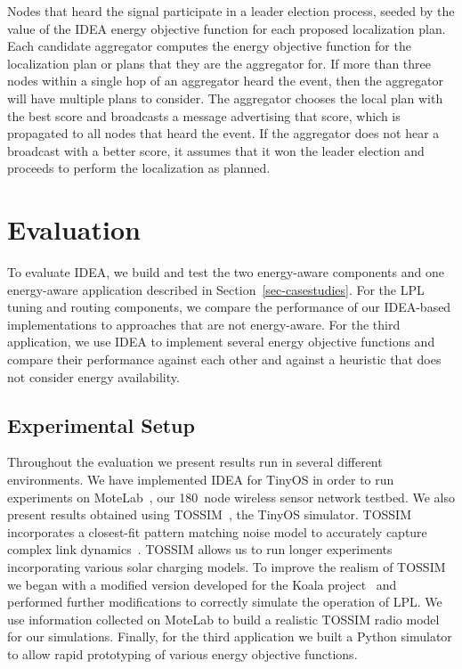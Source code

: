 \documentclass{sig-alternate}
\begin{document}
Nodes that heard the signal participate in a leader election process, seeded
by the value of the IDEA energy objective function for each proposed
localization plan. Each candidate aggregator computes the energy objective
function for the localization plan or plans that they are the aggregator for.
If more than three nodes within a single hop of an aggregator heard the
event, then the aggregator will have multiple plans to consider. The
aggregator chooses the local plan with the best score and broadcasts a
message advertising that score, which is propagated to all nodes that heard
the event. If the aggregator does not hear a broadcast with a better score,
it assumes that it won the leader election and proceeds to perform the
localization as planned. 

\section{Evaluation}
\label{sec-evaluation}
\label{sec-eval}

To evaluate IDEA, we build and test the two energy-aware components and one
energy-aware application described in Section~\ref{sec-casestudies}. For the
LPL tuning and routing components, we compare the performance of our
IDEA-based implementations to approaches that are not energy-aware. For the
third application, we use IDEA to implement several energy objective
functions and compare their performance against each other and against a
heuristic that does not consider energy availability.

\vfill\eject

\subsection{Experimental Setup}
\label{subsec-experimentalsetup}

Throughout the evaluation we present results run in several different
environments. We have implemented IDEA for TinyOS in order to run experiments
on MoteLab~\cite{motelab}, our 180~node wireless sensor network testbed. We
also present results obtained using TOSSIM~\cite{tossim}, the TinyOS
simulator. TOSSIM incorporates a closest-fit pattern matching noise model to
accurately capture complex link dynamics~\cite{cpm-ipsn07}. TOSSIM allows us
to run longer experiments incorporating various solar charging models. To
improve the realism of TOSSIM we began with a modified version developed for
the Koala project~\cite{koala-ipsn08} and performed further modifications to
correctly simulate the operation of LPL. We use information collected on
MoteLab to build a realistic TOSSIM radio model for our simulations. Finally,
for the third application we built a Python simulator to allow rapid
prototyping of various energy objective functions.
\end{document}
